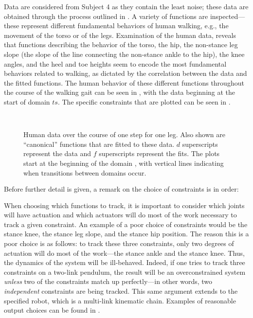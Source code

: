 Data are considered from Subject 4 as they contain the least noise; these data
are obtained through the process outlined in .
%
A variety of functions are inspected---these represent different fundamental
behaviors of human walking, e.g., the movement of the torso or of the legs.
%
Examination of the human data, reveals that functions describing the behavior of
the torso, the hip, the non-stance leg slope (the slope of the line connecting
the non-stance ankle to the hip), the knee angles, and the heel and toe heights
seem to encode the most fundamental behaviors related to walking, as dictated by
the correlation between the data and the fitted functions.
%
The human behavior of these different functions throughout the course of the
walking gait can be seen in , with the data
beginning at the start of domain $ts$.
%
The specific constraints that are plotted can be seen in .


\begin{figure}[t!]
  \centering
  \\
  \caption[Human data over the course of one step for one leg.]{Human data over
    the course of one step for one leg.
    Also shown are ``canonical'' functions that are fitted to these data.
    $d$ superscripts represent the data and $f$ superscripts represent the
    fits.
    The plots start at the beginning of the domain {\DA}, with vertical lines
    indicating when transitions between domains occur.}
    \label{fig:constraints-fitting}
\end{figure}

Before further detail is given, a remark on the choice of constraints is in
order:
%
\begin{remark} \label{rmk:actuation}
  When choosing which functions to track, it is important to consider which
  joints will have actuation and which actuators will do most of the work
  necessary to track a given constraint.
  An example of a poor choice of constraints would be the stance knee, the
  stance leg slope, and the stance hip position.
  The reason this is a poor choice is as follows:
  to track these three constraints, only two degrees of actuation will do most
  of the work---the stance ankle and the stance knee.
  Thus, the dynamics of the system will be ill-behaved.
  Indeed, if one tries to track three constraints on a two-link pendulum, the
  result will be an overconstrained system {\em unless} two of the constraints
  match up perfectly---in other words, two {\em independent} constraints are
  being tracked.
  This same argument extends to the specified robot, which is a multi-link
  kinematic chain.
  Examples of reasonable output choices can be found in \cite{Sinnet2014}.
\end{remark}


